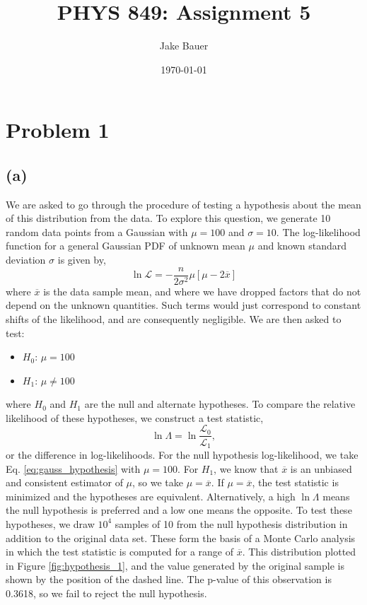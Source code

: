 \documentclass[12pt]{article}
\begin{document}
\title{PHYS 849: Assignment 5}
\author{Jake Bauer}
\date{\today}
\maketitle

\section*{Problem 1}

\subsection*{(a)}
We are asked to go through the procedure of testing a hypothesis about the mean of this distribution from the data.  To explore this question, we generate 10 random data points from a Gaussian with $\mu = 100$ and $\sigma = 10$.  The log-likelihood function for a general Gaussian PDF of unknown mean $\mu$ and known standard deviation
$\sigma$ is given by,
\begin{equation} \label{eq:gauss_hypothesis}
\ln \mathcal{L} = -\frac{n}{2 \sigma^2} \mu \left[\mu - 2 \overline{x}\right]
\end{equation} 
where $\overline{x}$ is the data sample mean, and where we have dropped factors that do not depend on the unknown quantities.  Such terms would just correspond to constant shifts of the likelihood, and are consequently negligible.  We are then asked to test:
\begin{itemize}
\item $H_0$: $\mu = 100$
\item $H_1$: $\mu \neq 100$
\end{itemize}
where $H_0$ and $H_1$ are the null and alternate hypotheses.  To compare the relative likelihood of these hypotheses, we construct a test statistic,
\begin{equation}
\ln \Lambda = \ln \frac{\mathcal{L}_0}{\mathcal{L}_1},
\end{equation}
or the difference in log-likelihoods. For the null hypothesis log-likelihood, we take Eq. \eqref{eq:gauss_hypothesis} with $\mu = 100$.  For $H_1$, we know that $\overline{x}$ is an unbiased and consistent estimator of $\mu$, so we take $\mu = \overline{x}$.  If $\mu = \overline{x}$, the test statistic is minimized and the hypotheses are equivalent.  Alternatively, a high $\ln \Lambda$ means the null hypothesis is preferred and a low one means the opposite.  To test these hypotheses, we draw $10^4$ samples of 10 from the null hypothesis distribution in addition to the original data set. These form the basis of a Monte Carlo analysis in which the test statistic is computed for a range of $\overline{x}$.  This distribution plotted in Figure \ref{fig:hypothesis_1}, and the value generated by the original sample is shown by the position of the dashed line.  The p-value of this observation is 0.3618, so we fail to reject the null hypothesis.
\end{document}

